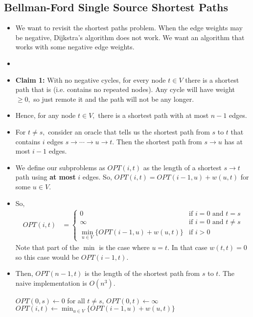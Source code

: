 \documentclass[a4paper,12pt]{article}
\begin{document}
\subsection{Bellman-Ford Single Source Shortest Paths}
\begin{itemize}
    \item We want to revisit the shortest paths problem. When the edge weights may be negative, Dijkstra's algorithm does not work. We want an algorithm that works with some negative edge weights.
    \item {}
    \item \textbf{Claim 1:} With no negative cycles, for every node $t\in V$ there is a shortest path that is  (i.e. contains no repeated nodes). Any cycle will have weight $\geq0,$ so just remote it and the path will not be any longer.
    \item Hence, for any node $t\in V,$ there is a shortest path with at most $n-1$ edges.
    \item For $t\neq s,$ consider an oracle that tells us the shortest path from $s$ to $t$ that contains $i$ edges $s\to\cdots\to u\to t.$ Then the shortest path from $s\to u$ has at most $i-1$ edges.
    \item We define our subproblems as $OPT(i,t)$ as the length of a shortest $s\to t$ path using \textbf{at most} $i$ edges. So, $OPT(i,t)=OPT(i-1,u)+w(u,t)$ for some $u\in V.$
    \item So, \begin{align}
        OPT(i,t)&=\begin{cases}
            0&\text{if $i=0$ and $t=s$}\\
            \infty&\text{if $i=0$ and $t\neq s$}\\
            \min_{u\in V}\{OPT(i-1,u)+w(u,t)\}&\text{if $i>0$}
        \end{cases}
    \end{align}
    Note that part of the $\min$ is the case where $u=t.$ In that case $w(t,t)=0$ so this case would be $OPT(i-1,t).$
    \item Then, $OPT(n-1,t)$ is the length of the shortest path from $s$ to $t.$ The naive implementation is $O(n^3).$ \begin{algorithmic}[1]
        \State $OPT(0,s)\gets0$
        \State for all $t\neq s,\,OPT(0,t)\gets\infty$
                \State $OPT(i,t)\gets\min_{u\in V}\{OPT(i-1,u)+w(u,t)\}$

\end{algorithmic}
\end{itemize}
\end{document}
